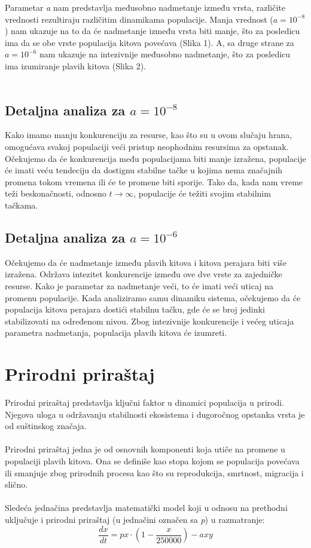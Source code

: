 \documentclass[a4paper]{article}
\begin{document}
{	\newpage	

	Parametar \textit{a} nam predstavlja međusobno nadmetanje između vrsta, različite vrednosti rezultiraju različitim dinamikama populacije. Manja vrednost ($a = 10^{-8}$) nam ukazuje na to da će nadmetanje između vrsta biti manje, što za posledicu ima da se obe vrste populacija kitova povećava (Slika 1). A, sa druge strane za $a = 10^{-6}$ nam ukazuje na intezivnije međusobno nadmetanje, što za posledicu ima izumiranje plavih kitova (Slika 2). \\ 
	\\ 
	\subsection{Detaljna analiza za $a = 10^{-8}$}
	\label{sec: Dmodel_e8}
	
	Kako imamo manju konkurenciju za resurse, kao što su u ovom slučaju hrana, omogućava svakoj populaciji veći pristup neophodnim resursima za opstanak. Očekujemo da će konkurencija među populacijama biti manje izražena, populacije će imati veću tendeciju da dostignu stabilne tačke u kojima nema značajnih promena tokom vremena ili će te promene biti sporije. Tako da, kada nam vreme teži beskonačnosti, odnosno $t \to \infty$, populacije će težiti svojim stabilnim tačkama.
			
	\subsection{Detaljna analiza za $a = 10^{-6}$}
	\label{sec: Dmodel_e6}
	
	Očekujemo da će nadmetanje između plavih kitova i kitova perajara biti više izražena. Održava intezitet konkurencije između ove dve vrste za zajedničke resurse. Kako je parametar za nadmetanje veći, to će imati veći uticaj na promenu populacije. Kada analiziramo samu dinamiku sistema, očekujemo da će populacija kitova perajara dostići stabilnu tačku, gde će se broj jedinki stabilizovati na određenom nivou. Zbog intezivnije konkurencije i većeg uticaja parametra nadmetanja, populacija plavih kitova će izumreti. 
		
	
	\section{Prirodni priraštaj}
	\label{sec: prirodni-prirastaj}
	
	Prirodni priraštaj predstavlja ključni faktor u dinamici populacija u prirodi. Njegova uloga u održavanju stabilnosti ekosistema i dugoročnog opstanka vrsta je od suštinskog značaja. \\
	\\
	Prirodni priraštaj jedna je od osnovnih komponenti koja utiče na promene u populaciji plavih kitova. Ona se definiše kao stopa kojom se populacija povećava ili smanjuje zbog prirodnih procesa kao što su reprodukcija, smrtnost, migracija i slično. \\ 
	\\
	Sledeća jednačina predstavlja matematički model koji u odnosu na prethodni uključuje i prirodni priraštaj (u jednačini označen sa \textit{p}) u razmatranje: \\ 
	\[
		\frac{dx}{dt} = px \cdot (1 - \frac{x}{250000}) - axy
	\]
	
}
\end{document}
